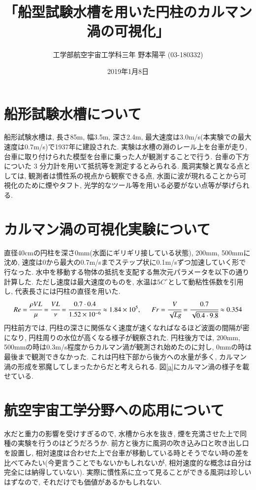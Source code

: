 \documentclass[12pt]{jsarticle}
\title{「船型試験水槽を用いた円柱のカルマン渦の可視化」}
\author{工学部航空宇宙工学科三年 野本陽平 (03-180332)}
\date{2019年1月8日}
\begin{document}
\maketitle
\section{船形試験水槽について}
船形試験水槽は, 長さ85m, 幅3.5m, 深さ2.4m, 最大速度は3.0m/s(本実験での最大速度は0.7m/s)で1937年に建設された. 実験は水槽の淵のレール上を台車が走り, 台車に取り付けられた模型を台車に乗った人が観測することで行う. 台車の下方についた 3 分力計を用いて抵抗等を測定するとみられる. 風洞実験と異なる点としては, 観測者は慣性系の視点から観察できる点, 水面に波が現れることから可視化のために煙やタフト, 光学的なツール等を用いる必要がない点等が挙げられる.
\section{カルマン渦の可視化実験について}
直径40cmの円柱を深さ0mm(水面にギリギリ接している状態), 200mm, 500mmに沈め, 速度は0から最大の0.7m/sまでステップ状に0.1m/sずつ加速していく形で行なった. 水中を移動する物体の抵抗を支配する無次元パラメータを以下の通り計算した. ただし速度は最大速度のものを, 水温は$5C^{\circ}$として動粘性係数を引用し, 代表長さには円柱の直径を用いた.
\[Re = \cfrac{\rho VL}{\mu} = \cfrac{VL}{\nu} =\cfrac{0.7 \cdot 0.4}{1.52 \times 10^{-6}} \approx 1.84 \times 10^5 , \indent Fr = \cfrac{V}{\sqrt{Lg}} = \cfrac{0.7}{\sqrt{0.4 \cdot 9.8}} \approx 0.354 \]
円柱前方では, 円柱の深さに関係なく速度が速くなればなるほど波面の間隔が密になり, 円柱周りの水位が高くなる様子が観察された. 円柱後方では, 200mm, 500mmの時は0.3m/s程度からカルマン渦が観測され始めたのに対し, 0mmの時は最後まで観測できなかった. これは円柱下部から後方への水量が多く, カルマン渦の形成を邪魔してしまったからだと考えられる. 図\ref{a}にカルマン渦の様子を載せている.
\section{航空宇宙工学分野への応用について}
水だと重力の影響を受けすぎるので, 水槽から水を抜き, 煙を充満させた上で同種の実験を行うのはどうだろうか. 前方と後方に風洞の吹き込み口と吹き出し口を設置し, 相対速度は合わせた上で台車が移動している時とそうでない時の差を比べてみたい(今更言うことでもないかもしれないが, 相対速度的な概念は自分は完全には納得していない). 実際に慣性系に立って見ることができる風洞は珍しいはずなので, それだけでも価値があるかもしれない.
\end{document}
